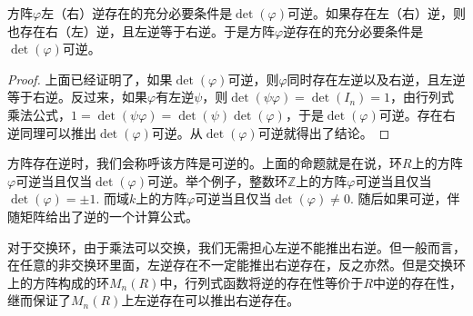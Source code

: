 \begin{pro}
方阵$\varphi$左（右）逆存在的充分必要条件是$\det(\varphi)$可逆。如果存在左（右）逆，则也存在右（左）逆，且左逆等于右逆。于是方阵$\varphi$逆存在的充分必要条件是$\det(\varphi)$可逆。
\end{pro}

\begin{proof}
上面已经证明了，如果$\det(\varphi)$可逆，则$\varphi$同时存在左逆以及右逆，且左逆等于右逆。反过来，如果$\varphi$有左逆$\psi$，则$\det(\psi\varphi)=\det(I_n)=1$，由行列式乘法公式，$1=\det(\psi\varphi)=\det(\psi)\det(\varphi)$，于是$\det(\varphi)$可逆。存在右逆同理可以推出$\det(\varphi)$可逆。从$\det(\varphi)$可逆就得出了结论。
\end{proof}

方阵存在逆时，我们会称呼该方阵是可逆的。上面的命题就是在说，环$R$上的方阵$\varphi$可逆当且仅当$\det(\varphi)$可逆。举个例子，整数环$\mathbb{Z}$上的方阵$\varphi$可逆当且仅当$\det(\varphi)=\pm 1$. 而域$k$上的方阵$\varphi$可逆当且仅当$\det(\varphi)\neq 0$. 随后如果可逆，伴随矩阵给出了逆的一个计算公式。

对于交换环，由于乘法可以交换，我们无需担心左逆不能推出右逆。但一般而言，在任意的非交换环里面，左逆存在不一定能推出右逆存在，反之亦然。但是交换环上的方阵构成的环$M_n(R)$中，行列式函数将逆的存在性等价于$R$中逆的存在性，继而保证了$M_n(R)$上左逆存在可以推出右逆存在。